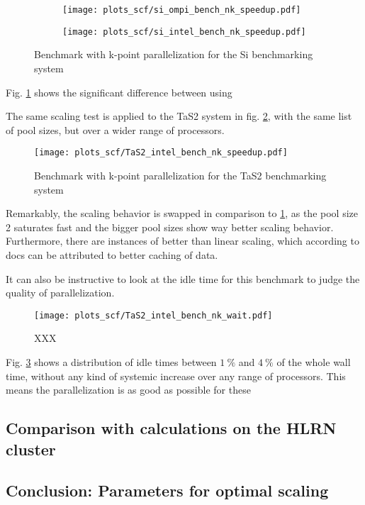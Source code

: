\documentclass[main.tex]{subfiles}
\begin{document}
\begin{figure}[h!]
\begin{subfigure}[b]{0.49\textwidth}
    \centering
    \texttt{[image: plots\_scf/si\_ompi\_bench\_nk\_speedup.pdf]}
\end{subfigure}
\begin{subfigure}[b]{0.49\textwidth}
    \centering
    \texttt{[image: plots\_scf/si\_intel\_bench\_nk\_speedup.pdf]}
\end{subfigure}
\caption{Benchmark with k-point parallelization for the Si benchmarking system}
\label{fig:scaling_nk_si}
\end{figure}

Fig. \ref{fig:scaling_nk_si} shows the significant difference between using 

The same scaling test is applied to the TaS2 system in fig. \ref{fig:scaling_nk_tas2}, with the same list of pool sizes, but over a wider range of processors.

\begin{figure}[h!]
    \centering
    \texttt{[image: plots\_scf/TaS2\_intel\_bench\_nk\_speedup.pdf]}
    \caption{Benchmark with k-point parallelization for the TaS2 benchmarking system}
    \label{fig:scaling_nk_tas2}
\end{figure}

Remarkably, the scaling behavior is swapped in comparison to \ref{fig:scaling_nk_si}, as the pool size 2 saturates fast and the bigger pool sizes show way better scaling behavior.
Furthermore, there are instances of better than linear scaling, which according to \QE docs can be attributed to better caching of data.

It can also be instructive to look at the idle time for this benchmark to judge the quality of parallelization. 

\begin{figure}[h!]
    \centering
    \texttt{[image: plots\_scf/TaS2\_intel\_bench\_nk\_wait.pdf]}
    \caption{XXX}
    \label{fig:scaling_nk_tas2_wait}
\end{figure}

Fig. \ref{fig:scaling_nk_tas2_wait} shows a distribution of idle times between \(\SI{1}{\percent}\) and \(\SI{4}{\percent}\) of the whole wall time, without any kind of systemic increase over any range of processors.
This means the parallelization is as good as possible for these 

\subsection{Comparison with calculations on the HLRN cluster}

\subsection{Conclusion: Parameters for optimal scaling}
\end{document}
